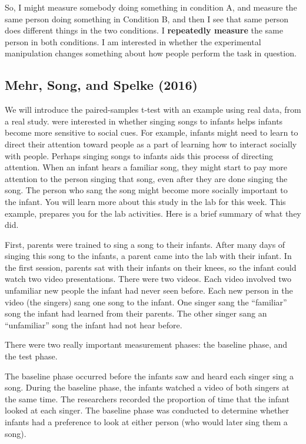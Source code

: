 \documentclass[
]{book}
\begin{document}
So, I might measure somebody doing something in condition A, and measure the same person doing something in Condition B, and then I see that same person does different things in the two conditions. I \textbf{repeatedly measure} the same person in both conditions. I am interested in whether the experimental manipulation changes something about how people perform the task in question.

\hypertarget{mehr-song-and-spelke-2016}{%
\subsection{Mehr, Song, and Spelke (2016)}\label{mehr-song-and-spelke-2016}}

We will introduce the paired-samples t-test with an example using real data, from a real study. \citet{mehr20165} were interested in whether singing songs to infants helps infants become more sensitive to social cues. For example, infants might need to learn to direct their attention toward people as a part of learning how to interact socially with people. Perhaps singing songs to infants aids this process of directing attention. When an infant hears a familiar song, they might start to pay more attention to the person singing that song, even after they are done singing the song. The person who sang the song might become more socially important to the infant. You will learn more about this study in the lab for this week. This example, prepares you for the lab activities. Here is a brief summary of what they did.

First, parents were trained to sing a song to their infants. After many days of singing this song to the infants, a parent came into the lab with their infant. In the first session, parents sat with their infants on their knees, so the infant could watch two video presentations. There were two videos. Each video involved two unfamiliar new people the infant had never seen before. Each new person in the video (the singers) sang one song to the infant. One singer sang the ``familiar'' song the infant had learned from their parents. The other singer sang an ``unfamiliar'' song the infant had not hear before.

There were two really important measurement phases: the baseline phase, and the test phase.

The baseline phase occurred before the infants saw and heard each singer sing a song. During the baseline phase, the infants watched a video of both singers at the same time. The researchers recorded the proportion of time that the infant looked at each singer. The baseline phase was conducted to determine whether infants had a preference to look at either person (who would later sing them a song).
\end{document}
